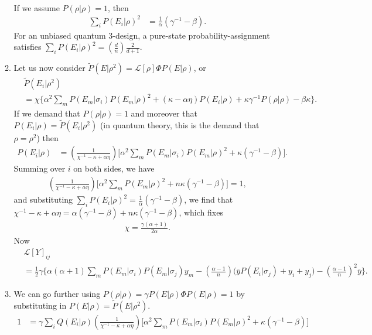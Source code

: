 \documentclass[11pt]{article}
\begin{document}
\begin{enumerate}
\begin{enumerate}
\begin{align}
\end{align}
If we assume $P(\rho|\rho)=1$, then
\begin{align}
\sum_i P(E_i|\rho)^2 &= \frac{1}{\alpha}\left(\gamma^{-1}	-\beta\right).
\end{align}
For an unbiased quantum 3-design, a pure-state probability-assignment satisfies $\sum_i P(E_i|\rho)^2 = \left(\frac{d}{n}\right)\frac{2}{d+1}$.
\item Let us now consider $\tilde{P}(E|\rho^2)=\mathcal{L}[\rho]\Phi P(E|\rho)$, or
\begin{align}
&\tilde{P}(E_i|\rho^2)\\
	&=\chi \Bigg\{\alpha^2 \sum_m P(E_m|\sigma_i)P(E_m|\rho)^2+(\kappa-\alpha \eta) P(E_i|\rho) + \kappa \gamma^{-1}P(\rho|\rho) - \beta \kappa \Bigg\}.\nonumber
\end{align}
If we demand that $P(\rho|\rho)=1$ and moreover that $P(E_i|\rho)=\tilde{P}(E_i|\rho^2)$ (in quantum theory, this is the demand that $\rho=\rho^2$) then
\begin{align}
	P(E_i|\rho)&=\left(\frac{1}{\chi^{-1} -\kappa+\alpha \eta}\right)\Bigg[\alpha^2 \sum_m P(E_m|\sigma_i)P(E_m|\rho)^2+  \kappa (\gamma^{-1} - \beta)\Bigg].
\end{align}
Summing over $i$ on both sides, we have
\begin{align}
\left(\frac{1}{\chi^{-1} -\kappa+\alpha \eta}\right)\Bigg[\alpha^2 \sum_m P(E_m|\rho)^2+  n\kappa (\gamma^{-1} - \beta)\Bigg] = 1,
\end{align}
and substituting $\sum_i P(E_i|\rho)^2 = \frac{1}{\alpha}\left(\gamma^{-1}	-\beta\right)$, we find  that $\chi^{-1} -\kappa+\alpha \eta=\alpha(\gamma^{-1}-\beta)+  n\kappa (\gamma^{-1} - \beta)  $,
which fixes 
\begin{align}
\chi = \frac{\gamma (\alpha+1)}{2\alpha}.
\end{align}
Now
\begin{align}
&\mathcal{L}[Y]_{ij}\\
&=\frac{1}{2}\gamma \Bigg\{\alpha(\alpha+1)\sum_{m}P(E_m|\sigma_i) P(E_m|\sigma_j)y_m-\left(\frac{\alpha-1}{n}\right)\Big(\bar{y} P(E_i|\sigma_j)+y_i + y_j\Big)-\left(\frac{\alpha-1}{n}\right)^2\bar{y}\Bigg\}.\nonumber
\end{align}
\item We can go further using $P(\rho|\rho) =\gamma P(E|\rho)\Phi P(E|\rho)=1$ by substituting in $P(E|\rho)=\tilde{P}(E|\rho^2)$. 
\begin{align}
	1&= \gamma \sum_i Q(E_i|\rho)\left(\frac{1}{\chi^{-1} -\kappa+\alpha \eta}\right)\Bigg[\alpha^2 \sum_m P(E_m|\sigma_i)P(E_m|\rho)^2+  \kappa (\gamma^{-1} - \beta)\Bigg]\\

\end{align}
\end{enumerate}
\end{enumerate}
\end{document}
